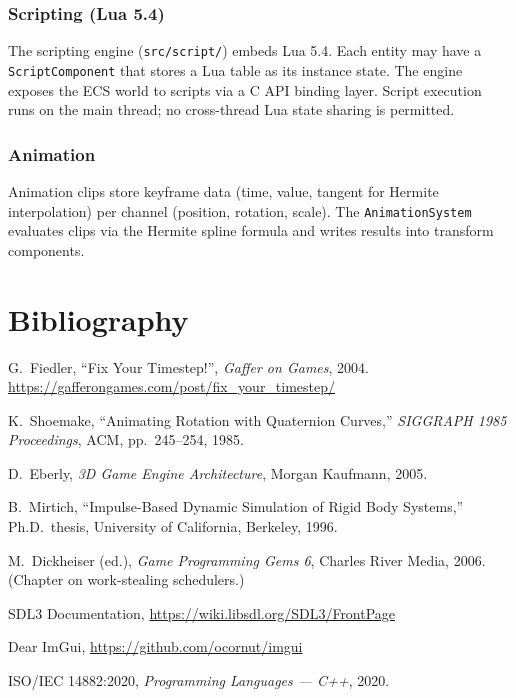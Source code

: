 \documentclass[12pt, a4paper]{report}
\theoremstyle{definition}
\theoremstyle{remark}
\begin{document}
\subsection{Scripting (Lua 5.4)}

The scripting engine (\texttt{src/script/}) embeds Lua 5.4.
Each entity may have a \texttt{ScriptComponent} that stores a Lua table
as its instance state. The engine exposes the ECS world to scripts via a
C API binding layer. Script execution runs on the main thread; no
cross-thread Lua state sharing is permitted.

\subsection{Animation}

Animation clips store keyframe data (time, value, tangent for Hermite
interpolation) per channel (position, rotation, scale). The
\texttt{AnimationSystem} evaluates clips via the Hermite spline formula
and writes results into transform components.

\chapter*{Bibliography}

\begin{enumerate}[label={[\arabic*]}]
  \item G.\ Fiedler, ``Fix Your Timestep!'', \emph{Gaffer on Games}, 2004.
        \url{https://gafferongames.com/post/fix_your_timestep/}

  \item K.\ Shoemake, ``Animating Rotation with Quaternion Curves,''
        \emph{SIGGRAPH 1985 Proceedings}, ACM, pp.\ 245--254, 1985.

  \item D.\ Eberly, \emph{3D Game Engine Architecture}, Morgan Kaufmann, 2005.

  \item B.\ Mirtich, ``Impulse-Based Dynamic Simulation of Rigid Body Systems,''
        Ph.D.\ thesis, University of California, Berkeley, 1996.

  \item M.\ Dickheiser (ed.), \emph{Game Programming Gems 6}, Charles River Media, 2006.
        (Chapter on work-stealing schedulers.)

  \item SDL3 Documentation, \url{https://wiki.libsdl.org/SDL3/FrontPage}

  \item Dear ImGui, \url{https://github.com/ocornut/imgui}

  \item ISO/IEC 14882:2020, \emph{Programming Languages — C++}, 2020.
\end{enumerate}
\end{document}
